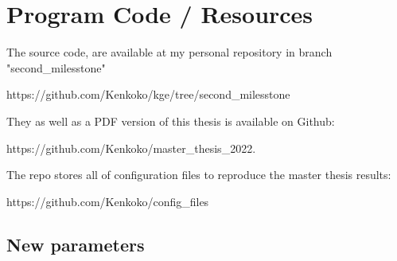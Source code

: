 \appendix



\chapter{Program Code / Resources}
\label{cha:appendix-a}

The source code, are available at my personal repository in branch "second\_milesstone"

\quad https://github.com/Kenkoko/kge/tree/second\_milesstone

\noindent They as well as a PDF version of this thesis is available on Github:  

\quad https://github.com/Kenkoko/master\_thesis\_2022.

\noindent The repo stores all of configuration files to reproduce the master thesis results: 

\quad https://github.com/Kenkoko/config\_files

\section{New parameters}
 
